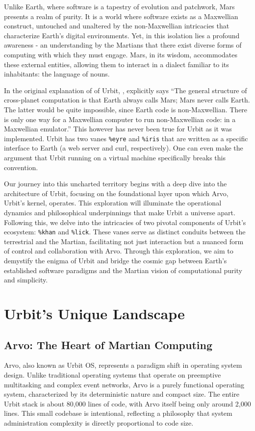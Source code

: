\documentclass[twoside]{article}
\begin{document}
Unlike Earth, where software is a tapestry of evolution and patchwork, Mars presents a realm of purity. 
It is a world where software exists as a Maxwellian construct, untouched and unaltered by the non-Maxwellian intricacies that characterize Earth’s digital environments. 
Yet, in this isolation lies a profound awareness - an understanding by the Martians that there exist diverse forms of computing with which they must engage. 
Mars, in its wisdom, accommodates these external entities, allowing them to interact in a dialect familiar to its inhabitants: the language of nouns.

In the original explanation of of Urbit, \citeauthor{Yarvin2010}, explicitly says ``The general structure of cross-planet computation is that Earth always calls Mars; Mars never calls Earth. The latter would be quite impossible, since Earth code is non-Maxwellian. There is only one way for a Maxwellian computer to run non-Maxwellian code: in a Maxwellian emulator.'' This however has never been true for Urbit as it was implemented. Urbit has two vanes \texttt{\%eyre} and \texttt{\%iris} that are written as a specific interface to Earth (a web server and curl, respectively). One can even make the argument that Urbit running on a virtual machine specifically breaks this convention. 

Our journey into this uncharted territory begins with a deep dive into the architecture of Urbit, focusing on the foundational layer upon which Arvo, Urbit's kernel, operates.
This exploration will illuminate the operational dynamics and philosophical underpinnings that make Urbit a universe apart. 
Following this, we delve into the intricacies of two pivotal components of Urbit’s ecosystem: 
\texttt{\%khan} and \texttt{\%lick}. 
These vanes serve as distinct conduits between the terrestrial and the Martian, facilitating not just interaction but a nuanced form of control and collaboration with Arvo.
Through this exploration, we aim to demystify the enigma of Urbit and bridge the cosmic gap between Earth’s established software paradigms and the Martian vision of computational purity and simplicity.

\section{Urbit's Unique Landscape}

\subsection{Arvo: The Heart of Martian Computing}
Arvo, also known as Urbit OS, represents a paradigm shift in operating system design. Unlike traditional operating systems that operate on preemptive multitasking and complex event networks, Arvo is a purely functional operating system, characterized by its deterministic nature and compact size. The entire Urbit stack is about 80,000 lines of code, with Arvo itself being only around 2,000 lines. This small codebase is intentional, reflecting a philosophy that system administration complexity is directly proportional to code size.
\end{document}
